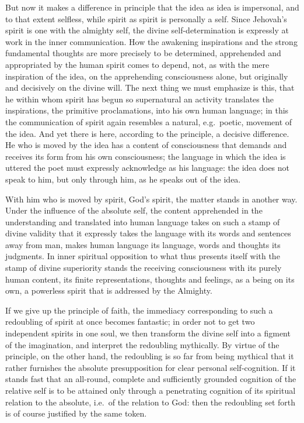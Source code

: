 \documentclass[12pt]{book}
\newcommand{\opage}[1]{\marginnote{\footnotesize\textit{[#1]}}}
\begin{document}
But now it makes a difference in principle that the idea as idea is
impersonal, and to that extent selfless, while spirit as spirit is
personally a self. Since Jehovah's spirit is one with the almighty self,
the divine self-determination is expressly at work in the inner
communication. How the awakening inspirations and the strong fundamental
thoughts are more precisely to be determined, apprehended and appropriated
by the human spirit comes to depend, not, as with the mere inspiration of
the idea, on the apprehending consciousness alone, but originally and
decisively on the divine will. The next thing we must emphasize is this,
that he within whom spirit has begun so supernatural an activity
translates the inspirations, the primitive proclamations, into his own
human language; in this the communication of spirit again resembles a
natural, e.g.\ poetic, movement of the idea. And yet there is here,
according to the principle, a decisive difference. He who is moved by the
idea has a content of consciousness that demands and receives its form
from his own consciousness; the language in which the idea is uttered the
poet must expressly acknowledge as his language: the idea does not speak
to him, but only through him, as he speaks out of the idea.

With him who is moved by spirit, God's spirit, the matter stands in
another way. Under the influence of the absolute self, the content
apprehended in the understanding and translated into human language takes
on
\opage{187}\setcounter{footnote}{0}%
such a stamp of divine validity that it expressly takes the language with
its words and sentences away from man, makes human language its language,
words and thoughts its judgments. In inner spiritual opposition to what
thus presents itself with the stamp of divine superiority stands the
receiving consciousness with its purely human content, its finite
representations, thoughts and feelings, as a being on its own, a powerless
spirit that is addressed by the Almighty.

If we give up the principle of faith, the immediacy corresponding to such a
redoubling of spirit at once becomes fantastic; in order not to get two
independent spirits in one soul, we then transform the divine self into a
figment of the imagination, and interpret the redoubling mythically. By
virtue of the principle, on the other hand, the redoubling is so far from
being mythical that it rather furnishes the absolute presupposition for
clear personal self-cognition. If
it stands fast that an all-round, complete and sufficiently grounded
cognition of the relative self is to be attained only through a
penetrating cognition of its spiritual relation to the absolute, i.e.\ of
the relation to God: then the redoubling set forth is of course justified
by the same token.
\end{document}

